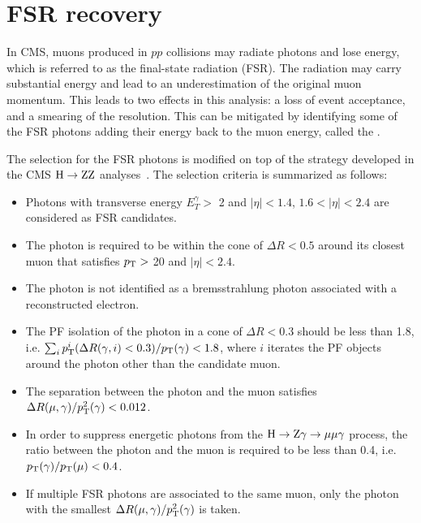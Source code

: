 \section{FSR recovery} \label{sec:fsr}

In CMS, muons produced in $pp$ collisions may radiate photons and lose energy, which is referred to as the final-state radiation (FSR).
The radiation may carry substantial energy and lead to an underestimation of the original muon momentum.
This leads to two effects in this analysis:
a loss of event acceptance, and a smearing of the \mmm resolution.
This can be mitigated by identifying some of the FSR photons adding their energy back to the muon energy, called the \FSR.

The selection for the FSR photons is modified on top of the strategy developed in the CMS $\mathrm{H} \to \mathrm{Z}\mathrm{Z}$ analyses~\cite{Sirunyan:2017exp, Sirunyan:2018qlb}.
The selection criteria is summarized as follows:
\begin{itemize}
  \item Photons with transverse energy $E^{\gamma}_{T} > $ 2 \GeV and $|\eta|<1.4$, $1.6<|\eta|<2.4$ are considered as FSR candidates.
  \item The photon is required to be within the cone of $\Delta{}R<0.5$ around its closest muon that satisfies $p_{\mathrm{T}} >$ 20 \GeV and $|\eta| < 2.4$.
  \item The photon is not identified as a bremsstrahlung photon associated with a reconstructed electron.
  \item The PF isolation of the photon in a cone of $\Delta{}R < 0.3$ should be less than 1.8, i.e. $\sum_{i}p_{\mathrm{T}}^{i}(\Delta{}R(\gamma, i)<0.3)/p_{\mathrm{T}}(\gamma) < 1.8$, 
        where $i$ iterates the PF objects around the photon other than the candidate muon.
  \item The separation between the photon and the muon satisfies $\Delta{}R(\mu, \gamma)/p_{\mathrm{T}}^{2}(\gamma) < 0.012$.
  \item In order to suppress energetic photons from the $\mathrm{H} \to \mathrm{Z}\gamma \to \mu\mu\gamma$ process,
        the \pt ratio between the photon and the muon is required to be less than 0.4, i.e. $p_{\mathrm{T}}(\gamma)/p_{\mathrm{T}}(\mu) < 0.4$.
  \item If multiple FSR photons are associated to the same muon, only the photon with the smallest $\Delta{}R(\mu, \gamma)/p_{\mathrm{T}}^{2}(\gamma)$ is taken.
\end{itemize}

